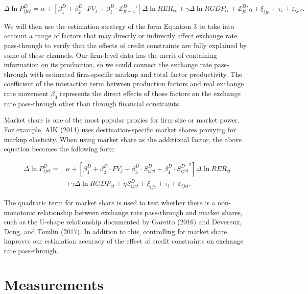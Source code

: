 \begin{equation}
	\Delta \ln P^{D}_{ijct}=\alpha+[\beta^D_{1}+ \beta^D_{2} \cdot FV_{j}+\beta^D_{3} \cdot {\mathbb{Z}^{D}_{jt-1}}'] \Delta \ln RER_{ct} +\gamma \Delta \ln RGDP_{ct}+ {\mathbb{Z}^{D}_{jt}}' \eta+\xi_{ijc}+\tau_{t} +\varepsilon_{ijct}.
	\label{eq4.3}
\end{equation}

We will then use the estimation strategy of the form Equation 3 to take into account a range of factors that may directly or indirectly affect exchange rate pass-through to verify that the effects of credit constraints are fully explained by some of these channels. Our firm-level data has the merit of containing information on its production, so we could connect the exchange rate pass-through with estimated firm-specific markup and total factor productivity. The coefficient of the interaction term between production factors and real exchange rate movement $\beta_3$ represents the direct effects of those factors on the exchange rate pass-through other than through financial constraints. 

Market share is one of the most popular proxies for firm size or market power. For example, AIK (2014)\cite{aik2014} uses destination-specific market shares proxying for markup elasticity. When using market share as the additional factor, the above equation becomes the following form:

\begin{equation}
	\begin{aligned}
	\Delta \ln P^{D}_{ijct}=&\alpha+[\beta^D_{1}+ \beta^D_{2} \cdot FV_{j}+\beta^D_{3} \cdot S^{D}_{ijct}+\beta^D_4 \cdot {S^{D}_{ijct}}^2] \Delta \ln RER_{ct} \\
	&+\gamma \Delta \ln RGDP_{ct}+ \eta S^{D}_{ijct}+\xi_{ijc}+\tau_{t} +\varepsilon_{ijct}.
	\end{aligned}
	\label{eq4.4}
\end{equation}

The quadratic term for market share is used to test whether there is a non-monotonic relationship between exchange rate pass-through and market shares, such as the U-shape relationship documented by Garetto (2016)\cite{garetto2016} and Devereux, Dong, and Tomlin (2017)\cite{devereux2017}. In addition to this, controlling for market share improves our estimation accuracy of the effect of credit constraints on exchange rate pass-through.

\section{Measurements}


